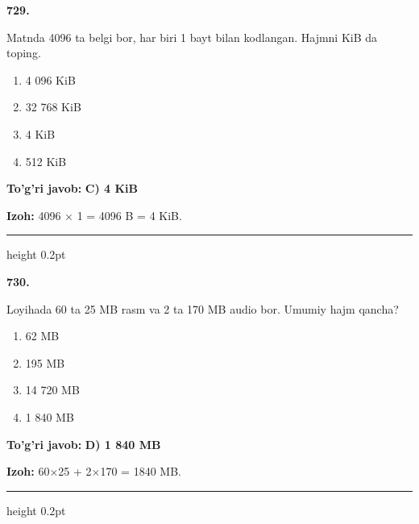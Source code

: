 \documentclass[10pt,a4paper,oneside]{article}
\begin{document}
\noindent\textbf{\color{ink}729.}
\par
Matnda 4096 ta belgi bor, har biri 1 bayt bilan kodlangan. Hajmni KiB da toping.
\begin{enumerate}[label=\Alph*),leftmargin=9mm]
\item 4 096 KiB
\item 32 768 KiB
\item 4 KiB
\item 512 KiB
\end{enumerate}
\begin{tcolorbox}[enhanced,breakable,colback=teal!4,colframe=teal!50!black,boxrule=0.5pt,arc=1.1mm,left=3mm,right=3mm,top=1.7mm,bottom=1.7mm,before skip=2mm,after skip=2mm]
\textbf{\color{teal}To'g'ri javob:} \textbf{C) 4 KiB}
\par\smallskip
\textbf{Izoh:} 4096 \ensuremath{\times} 1 = 4096 B = 4 KiB.
\end{tcolorbox}
\vspace{2mm}\hrule height 0.2pt \vspace{3mm}

\noindent\textbf{\color{ink}730.}
\par
Loyihada 60 ta 25 MB rasm va 2 ta 170 MB audio bor. Umumiy hajm qancha?
\begin{enumerate}[label=\Alph*),leftmargin=9mm]
\item 62 MB
\item 195 MB
\item 14 720 MB
\item 1 840 MB
\end{enumerate}
\begin{tcolorbox}[enhanced,breakable,colback=teal!4,colframe=teal!50!black,boxrule=0.5pt,arc=1.1mm,left=3mm,right=3mm,top=1.7mm,bottom=1.7mm,before skip=2mm,after skip=2mm]
\textbf{\color{teal}To'g'ri javob:} \textbf{D) 1 840 MB}
\par\smallskip
\textbf{Izoh:} 60\ensuremath{\times}25 + 2\ensuremath{\times}170 = 1840 MB.
\end{tcolorbox}
\vspace{2mm}\hrule height 0.2pt \vspace{3mm}
\end{document}
